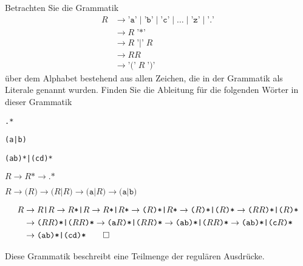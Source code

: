 Betrachten Sie die Grammatik 
\begin{align*}
R&\to \texttt{'a'} \;|\; \texttt{'b'} \;|\; \texttt{'c'} \;|\;\dots\;|\; \texttt{'z'} \;|\; \texttt{'.'}\\
 &\to R\; \texttt{'*'}\\
 &\to R\; \texttt{'|'}\; R\\
 &\to RR\\
 &\to \texttt{'('} \; R \; \texttt{')'}
\end{align*}
über dem Alphabet bestehend aus allen Zeichen, die in der Grammatik als
Literale genannt wurden.
Finden Sie die Ableitung für die folgenden Wörter in dieser Grammatik
\begin{teilaufgaben}
\item \texttt{.*}
\item \texttt{(a|b)}
\item \texttt{(ab)*|(cd)*}
\end{teilaufgaben}


\begin{loesung}
\begin{teilaufgaben}
\item
\(
R\to R\texttt{*}\to \texttt{.*}
\)
\item \(
R\to \texttt{(} R\texttt{)}
  \to \texttt{(}R\texttt{|}R\texttt{)}
  \to \texttt{(a|}R\texttt{)}
  \to \texttt{(a|b)}
\)
\item
\begin{align*}
R&\to R\texttt{|}R
  \to R\texttt{*|}R
  \to R\texttt{*|}R\texttt{*}
  \to \texttt{(}R\texttt{)*|}R\texttt{*}
  \to \texttt{(}R\texttt{)*|(}R\texttt{)*}
  \to \texttt{(}RR\texttt{)*|(}R\texttt{)*}
\\
 &\to \texttt{(}RR\texttt{)*|(}RR\texttt{)*}
  \to \texttt{(a}R\texttt{)*|(}RR\texttt{)*}
  \to \texttt{(ab)*|(}RR\texttt{)*}
  \to \texttt{(ab)*|(c}R\texttt{)*}
\\
 &\to \texttt{(ab)*|(cd)*}
\qedhere
\end{align*}
\end{teilaufgaben}
\end{loesung}

\begin{diskussion}
Diese Grammatik beschreibt eine Teilmenge der regulären Ausdrücke.
\end{diskussion}

